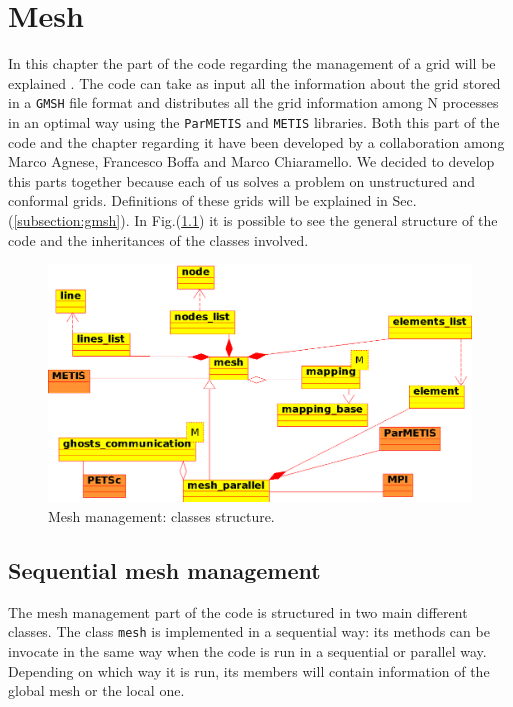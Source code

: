 \chapter{Mesh}\label{chapter:mesh}
In this chapter the part of the code regarding the management of a grid will be explained . The code can take as input all the information about the grid stored in a \verb|GMSH| file format and distributes all the grid information among N processes in an optimal way using the \verb|ParMETIS| and \verb|METIS| libraries. Both this part of the code and the chapter regarding it have been developed by a collaboration among Marco Agnese, Francesco Boffa and Marco Chiaramello. We decided to develop this parts together because each of us solves a problem on unstructured and conformal grids. Definitions of these grids will be explained in Sec.(\ref{subsection:gmsh}). In Fig.(\ref{fig:mesh_diagram}) it is possible to see the general structure of the code and the inheritances of the classes involved.

\begin{figure}
\centering
\includegraphics[scale=1]{images/mesh_diagram.eps}
\caption{Mesh management: classes structure.}
\label{fig:mesh_diagram}
\end{figure}

\section{Sequential mesh management}\label{section:mono_cpu}
The mesh management part of the code is structured in two main different classes. The class \verb|mesh| is implemented in a sequential way: its methods can be invocate in the same way when the code is run in a sequential or parallel way. Depending on which way it is run, its members will contain information of the global mesh or the local one.


